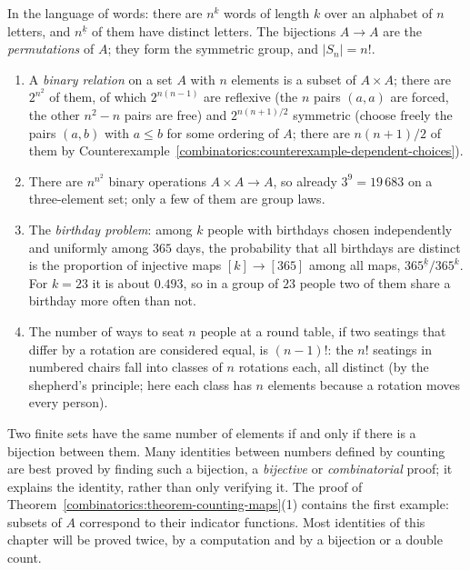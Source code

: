 In the language of words: there are $n^k$ words of length $k$ over an alphabet of $n$ letters, and $n^{\underline{k}}$ of them have distinct letters. The bijections $A \to A$ are the
\emph{permutations} of $A$; they form the symmetric group, and $|S_n| = n!$.

\begin{example}\label{combinatorics:example-counting-maps}
\begin{enumerate}
\item A \emph{binary relation} on a set $A$ with $n$ elements is a subset of $A \times A$; there are $2^{n^2}$ of them, of which $2^{n(n-1)}$ are reflexive (the $n$ pairs $(a, a)$ are forced, the
other $n^2 - n$ pairs are free) and $2^{n(n+1)/2}$ symmetric (choose freely the pairs $(a, b)$ with $a \leq b$ for some ordering of $A$; there are $n(n + 1)/2$ of them by
Counterexample~\ref{combinatorics:counterexample-dependent-choices}).
\item There are $n^{n^2}$ binary operations $A \times A \to A$, so already $3^9 = 19\,683$ on a three-element set; only a few of them are group laws.
\item The \emph{birthday problem}: among $k$ people with birthdays chosen independently and uniformly among $365$ days, the probability that all birthdays are distinct is the proportion of injective
maps $[k] \to [365]$ among all maps, $365^{\underline{k}}/365^k$. For $k = 23$ it is about $0.493$, so in a group of $23$ people two of them share a birthday more often than not.
\item The number of ways to seat $n$ people at a round table, if two seatings that differ by a rotation are considered equal, is $(n - 1)!$: the $n!$ seatings in numbered chairs fall into classes of
$n$ rotations each, all distinct (by the shepherd's principle; here each class has $n$ elements because a rotation moves every person).
\end{enumerate}
\end{example}

\begin{remark}\label{combinatorics:remark-bijective-proofs}
Two finite sets have the same number of elements if and only if there is a bijection between them. Many identities between numbers defined by counting are best proved by finding such a bijection,
a \emph{bijective} or \emph{combinatorial} proof; it explains the identity, rather than only verifying it. The proof of Theorem~\ref{combinatorics:theorem-counting-maps}(1) contains the first
example: subsets of $A$ correspond to their indicator functions. Most identities of this chapter will be proved twice, by a computation and by a bijection or a double count.
\end{remark}


